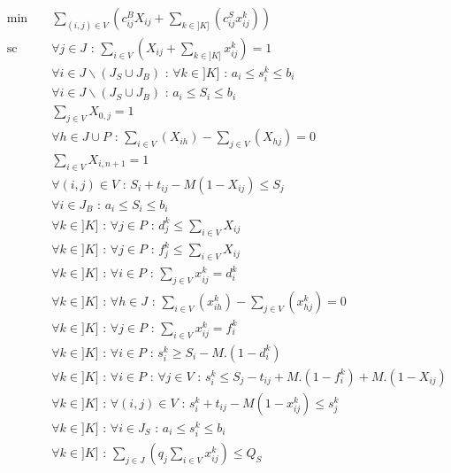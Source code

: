 \documentclass[12pt,a4paper,fleqn]{article}
\begin{document}
\begin{align}
& \text{min } && \sum \limits_{(i,j) \in V} (c^B_{ij}X_{ij} + \sum \limits_{k \in ]K]}( c^S_{ij}x^k_{ij})) \\[10pt]
& \text{sc }  && \forall j \in J \text{ : } \sum \limits_{i \in V}( X_{ij} + \sum \limits_{k \in ]K]} x^k_{ij} ) = 1 \label{tousservis} \\
& && \forall i \in J \backslash (J_S \cup J_B) \text{ : } \forall k \in ]K] \text{ : } a_i \leqslant s_i^k \leqslant b_i \label{fenetrerestant1} \\
& && \forall i \in J \backslash (J_S \cup J_B) \text{ : } a_i \leqslant S_i \leqslant b_i \label{fenetrerestant2} \\[30pt]
& && \sum \limits_{j \in V} X_{0,j} = 1 \label{partirdudepot} \\
& && \forall h \in J \cup P \text{ : } \sum \limits_{i \in V} (X_{ih}) - \sum \limits_{j \in V} (X_{hj}) = 0 \label{flotgros} \\
& && \sum \limits_{i \in V} X_{i,n+1} = 1 \label{reveniraudepot} \\
& && \forall (i,j) \in V \text{ : } S_i + t_{ij} - M(1-X_{ij}) \leqslant S_j \label{sequentialitegros} \\
& && \forall i \in J_B \text{ : } a_i \leqslant S_i \leqslant b_i \label{fenetregros} \\[30pt]
& && \forall k \in ]K] \text{ : } \forall j \in P \text{ : } d^k_j \leqslant \sum \limits_{i \in V} X_{ij} \label{separationvalide} \\
& && \forall k \in ]K] \text{ : } \forall j \in P \text{ : } f^k_j \leqslant \sum \limits_{i \in V} X_{ij} \label{mergevalide} \\
& && \forall k \in ]K] \text{ : } \forall i \in P \text{ : } \sum \limits_{j \in V} x^k_{ij} = d^k_i \label{partirdugros} \\
& && \forall k \in ]K] \text{ : } \forall h \in J \text{ : } \sum \limits_{i \in V} (x_{ih}^k) - \sum \limits_{j \in V} (x_{hj}^k) = 0 \label{flotpetit} \\
& && \forall k \in ]K] \text{ : } \forall j \in P \text{ : } \sum \limits_{i \in V} x^k_{ij} = f^k_i \label{reveniraugros} \\
& && \forall k \in ]K] \text{ : } \forall i \in P \text{ : } s_i^k \geqslant S_i - M.(1 - d_i^k) \label{datedebutpetit} \\
& && \forall k \in ]K] \text{ : } \forall i \in P \text{ : } \forall j \in V \text{ : } s_i^k \leqslant S_j -t_{ij} + M.(1 - f^k_i) + M.(1 - X_{ij}) \label{datedefinpetit} \\
& && \forall k \in ]K] \text{ : } \forall (i,j) \in V \text{ : } s_i^k + t_{ij} - M(1-x_{ij}^k) \leqslant s_j^k \label{sequentialitepetit} \\
& && \forall k \in ]K] \text{ : } \forall i \in J_S \text{ : } a_i \leqslant s_i^k \leqslant b_i \label{fenetrepetit} \\
& && \forall k \in ]K] \text{ : } \sum \limits_{j \in J} (q_j \sum \limits_{i \in V} x^k_{ij}) \leqslant Q_S  \label{capa} 
\end{align}
\end{document}
